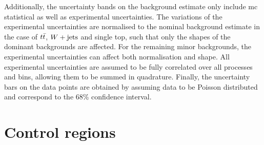Additionally, the uncertainty bands on the background estimate only include \gls{mc} statistical as well as experimental uncertainties.
The variations of the experimental uncertainties are normalised to the nominal background estimate in the case of $t\bar{t}$, $W+\mathrm{jets}$ and single top, such that only the shapes of the dominant backgrounds are affected.
For the remaining minor backgrounds, the experimental uncertainties can affect both normalisation and shape.
All experimental uncertainties are assumed to be fully correlated over all processes and bins, allowing them to be summed in quadrature.
Finally, the uncertainty bars on the data points are obtained by assuming data to be Poisson distributed and correspond to the 68\% confidence interval. 

\section{Control regions}\label{sec:control_regions}

\begin{table}
\begin{center}
\caption{Overview of the CR and VR definitions. With the exception of $\mlb$, which is not used in the definitions of the \glspl{cr} and \glspl{vr}, all regions share the same selection as the \glspl{sr} on the remaining kinematic observables not listed here.} 
\label{tab:CRVRdef}
\end{center}
\end{table}

